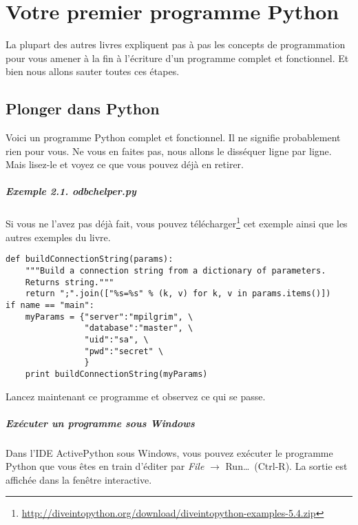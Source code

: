 \chapter{Votre premier programme Python}

La plupart des autres livres expliquent pas à pas les concepts de programmation pour vous amener à la fin à l'écriture d'un programme complet et fonctionnel. Et bien nous allons sauter toutes ces étapes.

\section{Plonger dans Python}

Voici un programme Python complet et fonctionnel. Il ne signifie probablement rien pour vous. Ne vous en faites pas, nous allons le disséquer ligne par ligne. Mais lisez-le et voyez ce que vous pouvez déjà en retirer.

\paragraph*{Exemple 2.1. odbchelper.py}

Si vous ne l’avez pas déjà fait, vous pouvez télécharger\footnote{\url{http://diveintopython.org/download/diveintopython-examples-5.4.zip}} cet exemple ainsi que les autres exemples du livre.

\begin{lstlisting}
def buildConnectionString(params):
    """Build a connection string from a dictionary of parameters.
    Returns string."""
    return ";".join(["%s=%s" % (k, v) for k, v in params.items()])
if name == "main":
    myParams = {"server":"mpilgrim", \
                "database":"master", \
                "uid":"sa", \
                "pwd":"secret" \
                }
    print buildConnectionString(myParams)
\end{lstlisting}

Lancez maintenant ce programme et observez ce qui se passe.

\paragraph*{Exécuter un programme sous Windows }

Dans l'IDE ActivePython sous Windows, vous pouvez exécuter le programme Python que vous êtes en train d'éditer par \emph{File} $\rightarrow$ Run…~(Ctrl-R). La sortie est affichée dans la fenêtre interactive.

